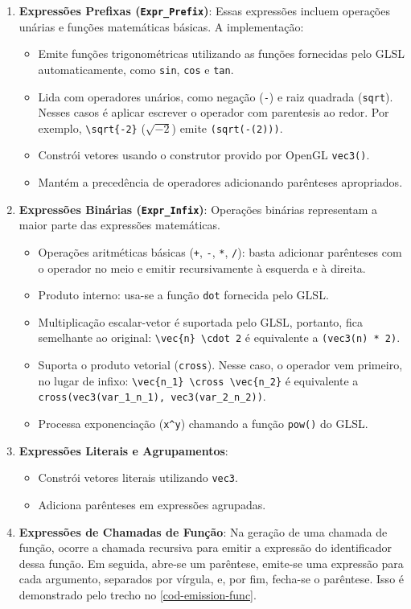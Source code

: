 \begin{enumerate}
    \item \textbf{Expressões Prefixas (\texttt{Expr\_Prefix})}:
    Essas expressões incluem operações unárias e funções matemáticas básicas. A implementação:
    \begin{itemize}
        \item Emite funções trigonométricas utilizando as funções fornecidas pelo GLSL automaticamente, como \verb|sin|, \verb|cos| e \verb|tan|.
        \item Lida com operadores unários, como negação (\verb|-|) e raiz quadrada (\verb|sqrt|). Nesses casos é aplicar escrever o operador com parentesis ao redor. Por exemplo, \verb"\sqrt{-2}" ($\sqrt{-2}$) emite \verb"(sqrt(-(2)))".
        \item Constrói vetores usando o construtor provido por OpenGL \verb|vec3()|.
        \item Mantém a precedência de operadores adicionando parênteses apropriados.
    \end{itemize}

    \item \textbf{Expressões Binárias (\texttt{Expr\_Infix})}:
    Operações binárias representam a maior parte das expressões matemáticas.
    \begin{itemize}
    \item Operações aritméticas básicas (\verb|+|, \verb|-|, \verb|*|, \verb|/|): basta adicionar parênteses com o operador no meio e emitir recursivamente à esquerda e à direita.
    \item Produto interno: usa-se a função \verb|dot| fornecida pelo GLSL.
    \item Multiplicação escalar-vetor é suportada pelo GLSL, portanto, fica semelhante ao original: \verb|\vec{n} \cdot 2| é equivalente a \verb|(vec3(n) * 2)|.
    \item Suporta o produto vetorial (\verb|cross|). Nesse caso, o operador vem primeiro, no lugar de infixo: \verb|\vec{n_1} \cross \vec{n_2}| é equivalente a \verb|cross(vec3(var_1_n_1), vec3(var_2_n_2))|.
    \item Processa exponenciação (\verb|x^y|) chamando a função \verb|pow()| do GLSL.
    \end{itemize}

    \item \textbf{Expressões Literais e Agrupamentos}:
    \begin{itemize}
        \item Constrói vetores literais utilizando \verb|vec3|.
        \item Adiciona parênteses em expressões agrupadas.
    \end{itemize}

    \item \textbf{Expressões de Chamadas de Função}:
       Na geração de uma chamada de função, ocorre a chamada recursiva para emitir a expressão do identificador dessa função. Em seguida, abre-se um parêntese, emite-se uma expressão para cada argumento, separados por vírgula, e, por fim, fecha-se o parêntese. Isso é demonstrado pelo trecho no \autoref{cod-emission-func}.

\end{enumerate}

